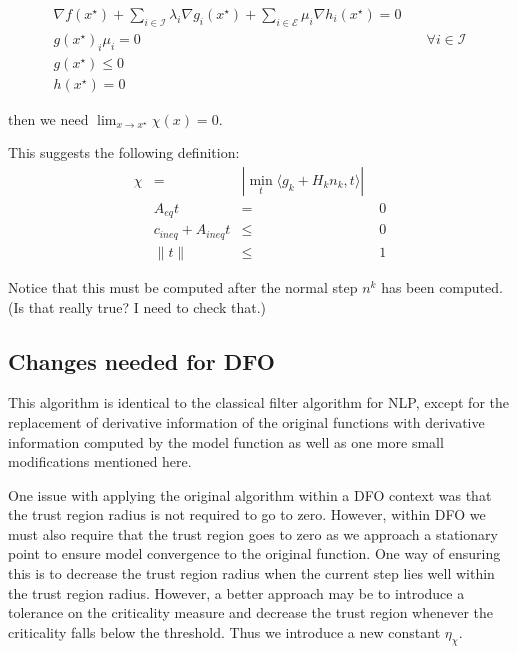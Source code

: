 \documentclass{article}
\begin{document}
\begin{align*}
\nabla f(x^{\star}) + \sum_{i\in\mathcal I} \lambda_i \nabla g_i(x^{\star}) + \sum_{i\in \mathcal E} \mu_i \nabla h_i(x^{\star})  = 0 \\
g(x^{\star})_i \mu_i = 0 & \quad \forall i\in\mathcal I \\
g(x^{\star}) \le 0 \\
h(x^{\star}) = 0
\end{align*}

then we need $\lim_{x\to x^{\star}} \chi(x) = 0$.

This suggests the following definition:
\begin{align*}
\chi & = & |\min_t \langle g_k + H_kn_k, t\rangle| \\
& A_{eq}t &=& \; 0 \\
& c_{ineq} + A_{ineq}t &\le& \; 0 \\
& \| t \| &\le& \; 1
\end{align*}

Notice that this must be computed after the normal step $n^k$ has been computed.
(Is that really true? I need to check that.)



\subsection{Changes needed for DFO}

This algorithm is identical to the classical filter algorithm for NLP, except for the replacement of derivative information of the original functions with derivative information computed by the model function as well as one more small modifications mentioned here.

One issue with applying the original algorithm within a DFO context was that the trust region radius is not required to go to zero.
However, within DFO we must also require that the trust region goes to zero as we approach a stationary point to ensure model convergence to the original function.
One way of ensuring this is to decrease the trust region radius when the current step lies well within the trust region radius.
However, a better approach may be to introduce a tolerance on the criticality measure and decrease the trust region whenever the criticality falls below the threshold. Thus we introduce a new constant $\eta_{\chi}$.
% 
% 
% 
\end{document}
